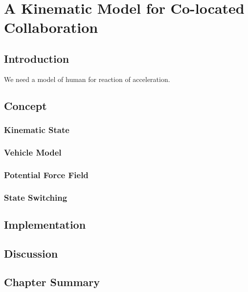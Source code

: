 \chapter{A Kinematic Model for Co-located Collaboration}
\label{chapter:kinematic_model}
\minitoc

\section{Introduction}
We need a model of human for reaction of acceleration.

\section{Concept}
\subsection{Kinematic State}
\subsection{Vehicle Model}
\subsection{Potential Force Field}
\subsection{State Switching}

\section{Implementation}

\section{Discussion}

\section{Chapter Summary}
